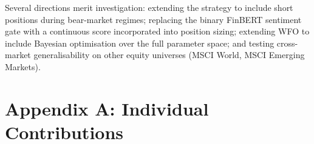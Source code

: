 \documentclass[11pt,twoside,a4paper]{article}
\begin{document}
Several directions merit investigation: extending the strategy to include short positions during bear-market regimes; replacing the binary FinBERT sentiment gate with a continuous score incorporated into position sizing; extending WFO to include Bayesian optimisation over the full parameter space; and testing cross-market generalisability on other equity universes (MSCI World, MSCI Emerging Markets).

\vfill
\newpage

\vfill
\newpage

\section*{Appendix A: Individual Contributions}

\end{document}
